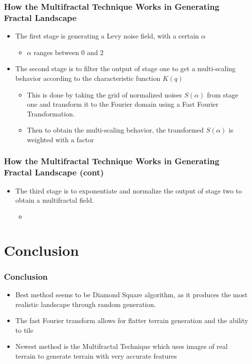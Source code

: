\documentclass{beamer}
\begin{document}
\begin{frame}
\frametitle{How the Multifractal Technique Works in Generating Fractal Landscape}
\begin{itemize}
\item The first stage is generating a Levy noise field, with a certain $\alpha$
\begin{itemize}
\item $\alpha$ ranges between 0 and 2 
\end{itemize}
\item The second stage is to filter the output of stage one to get a multi-scaling behavior according to the characteristic function $K(q)$
\begin{itemize}
\item This is done by taking the grid of normalized noises $S(\alpha)$ from stage one and transform it to the Fourier domain using a Fast Fourier Transformation.
\item Then to obtain the multi-scaling behavior, the transformed $S(\alpha)$ is weighted with a factor 
\end{itemize}
\end{itemize}
\end{frame}

\begin{frame}
\frametitle{How the Multifractal Technique Works in Generating Fractal Landscape (cont)}
\begin{itemize}
\item The third stage is to exponentiate and normalize the output of stage two to obtain a multifractal field.
\begin{itemize}
\item
\end{itemize}
\end{itemize}
\end{frame}

\section{Conclusion}

\begin{frame}
 \frametitle{Conclusion}
\begin{itemize}
  \item Best method seems to be Diamond Square algorithm, as it produces the most realistic landscape through random generation.
  \item The fast Fourier transform allows for flatter terrain generation and the ability to tile
 \item Newest method is the Multifractal Technique which uses images of real terrain to generate terrain with very accurate features
  \end{itemize}
  \end{frame}
  
\end{document}

